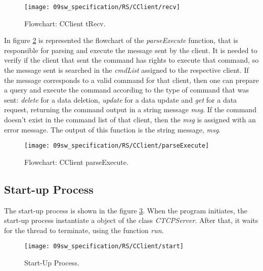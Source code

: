 \begin{figure}[H]
	\centering
	\texttt{[image: 09sw\_specification/RS/CClient/recv]}
	\caption{Flowchart: CClient tRecv.}
	\label{fig:RSRecv}
\end{figure}

In figure \ref{fig:parseExecute} is represented the flowchart of the \textit{parseExecute} function, that is responsible for parsing and execute the message sent by the client. It is needed to verify if the client that sent the command has rights to execute that command, so the message sent is searched in the \textit{cmdList} assigned to the respective client. If the message corresponds to a valid command for that client, then one can prepare a query and execute the command according to the type of command that was sent: \textit{delete} for a data deletion, \textit{update} for a data update and \textit{get} for a data request, returning the command output in a string message \textit{msg}. If the command doesn't exist in the command list of that client, then the \textit{msg} is assigned with an error message. The output of this function is the string message, \textit{msg}.

\begin{figure}[H]
	\centering
	\texttt{[image: 09sw\_specification/RS/CClient/parseExecute]}
	\caption{Flowchart: CClient parseExecute.}
	\label{fig:parseExecute}
\end{figure}

\subsection{Start-up Process}
The start-up process is shown in the figure \ref{fig:RSstart}. When the program initiates, the start-up process instantiate a object of the class \textit{CTCPServer}. After that, it waits for the thread to terminate, using the function \textit{run}.

\begin{figure}[H]
	\centering
	\texttt{[image: 09sw\_specification/RS/CClient/start]}
	\caption{Start-Up Process.}
	\label{fig:RSstart}
\end{figure}